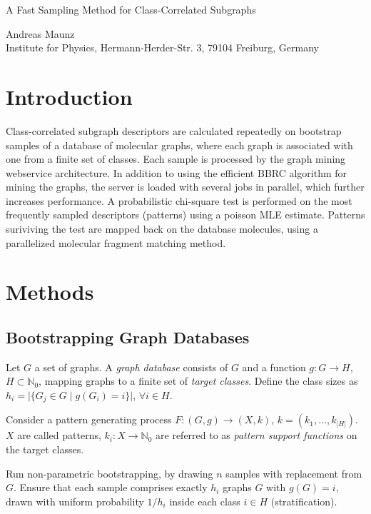 \documentclass{article}
\begin{document}
\begin{center}
\begin{huge}A Fast Sampling Method for Class-Correlated Subgraphs\end{huge}

Andreas Maunz \\Institute for Physics, Hermann-Herder-Str. 3, 79104 Freiburg, Germany
\end{center}

\section{Introduction}
Class-correlated subgraph descriptors are calculated repeatedly on bootstrap samples of a database of molecular graphs, where each graph is associated with one from a finite set of classes.
Each sample is processed by the graph mining webservice architecture. In addition to using the efficient BBRC algorithm for mining the graphs, the server is loaded with several jobs in parallel, which further increases performance.
A probabilistic chi-square test is performed on the most frequently sampled descriptors (patterns) using a poisson MLE estimate.
Patterns suriviving the test are mapped back on the database molecules, using a parallelized molecular fragment matching method.

\section{Methods}
\subsection{Bootstrapping Graph Databases}
Let $G$ a set of graphs. A \emph{graph database} consists of $G$ and a function $g: G \rightarrow H$, $H \subset \mathbb{N}_0$, mapping graphs to a finite set of \emph{target classes}. Define the class sizes as $h_i=\vert\{G_j \in G \; \vert\; g(G_i)=i\}\vert$, $\forall i \in H$.

Consider a pattern generating process $F: (G,g) \rightarrow (X,k)$, $k=\left(k_1,\ldots,k_{\vert H\vert}\right)$. $X$ are called patterns, $k_i: X \rightarrow \mathbb{N}_0$ are referred to as \emph{pattern support functions} on the target classes.

Run non-parametric bootstrapping, by drawing $n$ samples with replacement from $G$. Ensure that each sample comprises exactly $h_i$ graphs $G$ with $g(G)=i$, drawn with uniform probability $1/h_i$ inside each class $i \in H$ (stratification).
\end{document}
